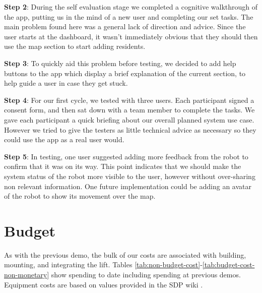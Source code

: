 \documentclass{article}
\begin{document}
{\bf Step 2}: During the self evaluation stage we completed a cognitive walkthrough of the app, putting us in the mind of a new user and completing our set tasks. The main problem found here was a general lack of direction and advice. Since the user starts at the dashboard, it wasn't immediately obvious that they should then use the map section to start adding residents.

{\bf Step 3}: To quickly aid this problem before testing, we decided to add help buttons to the app which display a brief explanation of the current section, to help guide a user in case they get stuck.

{\bf Step 4}: For our first cycle, we tested with three users. Each participant signed a consent form, and then sat down with a team member to complete the tasks. We gave each participant a quick briefing about our overall planned system use case. However we tried to give the testers as little technical advice as necessary so they could use the app as a real user would. 

{\bf Step 5}: In testing, one user suggested adding more feedback from the robot to confirm that it was on its way. This point indicates that we should make the system status of the robot more visible to the user, however without over-sharing non relevant information. One future implementation could be adding an avatar of the robot to show its movement over the map.

\section{Budget}
As with the previous demo, the bulk of our costs are associated with building, mounting, and integrating the lift. Tables \ref{tab:non-budget-cost}-\ref{tab:budget-cost-non-monetary} show spending to date including spending at previous demos. Equipment costs are based on values provided in the SDP wiki \cite{sdpcosts}.

\begin{table}[h]
\begin{center}
\caption{Non-budgeted monetary costs at demo \demoNumber. Note that we have chosen to stop using the EV3 and instead use the Arduino kit.}
\label{tab:non-budget-cost}
\end{center}
\end{table}
\end{document}
